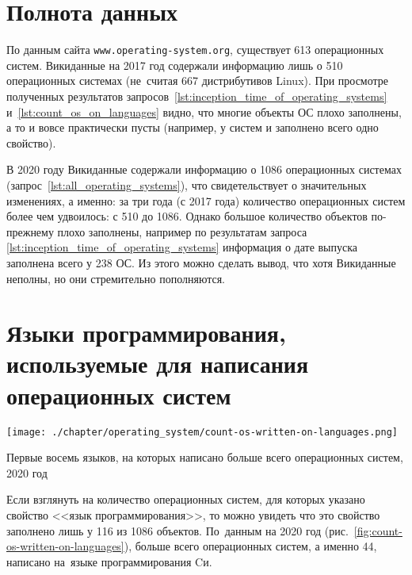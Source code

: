 \newpage
\section{Полнота данных}
По данным сайта \texttt{www.operating-system.org}, 
существует 613 операционных систем\autocite{list_operating_systems}. 
Викиданные на 2017 год содержали информацию лишь о 510 операционных системах 
(не~считая \num{667} дистрибутивов Linux\autocite{list_operating_systems}). 
При просмотре полученных результатов 
запросов~\ref{lst:inception_time_of_operating_systems} и~\ref{lst:count_os_on_languages} видно, 
что многие объекты ОС плохо заполнены, а то и вовсе практически пусты 
(например, у систем  и  заполнено всего одно свойство\autocite{prowd_os_link}).

В 2020 году Викиданные содержали информацию о 1086 операционных системах 
(запрос~\ref{lst:all_operating_systems}), что свидетельствует о значительных изменениях, 
а именно: за три года (с 2017 года) количество операционных систем более чем удвоилось: с 510 до 1086. 
Однако большое количество объектов по-прежнему плохо заполнены, 
например по результатам запроса \ref{lst:inception_time_of_operating_systems} 
информация о дате выпуска заполнена всего у 238 ОС. 
Из этого можно сделать вывод, что хотя Викиданные неполны, но они стремительно пополняются.




\section{Языки программирования, используемые для написания операционных систем}
%
\begin{marginfigure}[0\baselineskip]
	\texttt{[image: ./chapter/operating\_system/count-os-written-on-languages.png]}
    \caption[Первые языки, на которых написано больше всего ОС, 2020 год.]{Первые восемь языков, на которых написано больше всего операционных систем, 2020 год}
	\label{fig:count-os-written-on-languages}
\end{marginfigure}

Если взглянуть на количество операционных систем, для которых указано свойство <<язык программирования>>, 
    то можно увидеть что это свойство заполнено лишь у 116 из 1086 объектов. 
    По~данным на 2020 год (рис.~\ref{fig:count-os-written-on-languages}), 
    больше всего операционных систем, а именно 44, написано на~языке программирования Cи.





